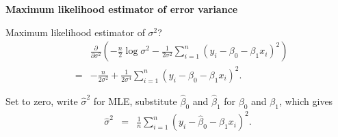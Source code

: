 \documentclass[landscape]{slides}
\newcommand{\heading}[1]{%
  \begin{center}
    \large\bf \color{red}
        #1
  \end{center}
  \vspace{1ex minus 1ex}}
\begin{document}
\begin{slide}
\heading{Maximum likelihood estimator of error variance}

Maximum likelihood estimator of $\sigma^2$?
%
\begin{eqnarray*}
  & &   \frac{\partial}{\partial \sigma^2}\left(
         -\frac{n}{2}\log\sigma^2 -\frac{1}{2\sigma^2}
         \sum_{i=1}^n (y_i-\beta_0-\beta_1 x_i)^2\right) \\
  & = &
        -\frac{n}{2\sigma^2}+\frac{1}{2\sigma^4} \sum_{i=1}^n(y_i-\beta_0
          -\beta_1 x_i)^2.
\end{eqnarray*}

Set to zero, write $\hat{\sigma}^2$ for MLE, substitute $\hat{\beta}_0$ and
$\hat{\beta}_1$ for $\beta_0$ and $\beta_1$,
which gives
\begin{eqnarray*}
   \hat{\sigma}^2 & = & \frac{1}{n}\sum_{i=1}^n (y_i-\hat{\beta}_0-\hat{\beta}_1 x_i)^2.
\end{eqnarray*}

\end{slide}
\end{document}
